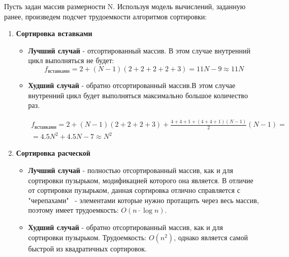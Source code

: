 \documentclass[a4paper,12pt]{report}
\begin{document}
\hspace{0.6cm}Пусть задан массив размерности N. Используя модель вычислений, заданную ранее, произведем подсчет трудоемкости алгоритмов сортировки:
\begin{enumerate}
\item \textbf{Сортировка вставками}
\begin{itemize}
\item \textbf{Лучший случай} - отсортированный массив. В этом случае внутренний цикл выполняться не будет:
\[
f_{вставками} = 2 + (N - 1)(2 + 2 + 2 + 2 + 3) = 11N - 9 \approx 11N 
\]
\item \textbf{Худший случай} - обратно отсортированный массив.В этом случае внутренний цикл будет выполняться максимально большое количество раз.

\begin{multline*}
f_{вставками} = 2 + (N - 1)(2 + 2 + 2 + 3) +  \frac{4 + 4 + 1 + (4+4+1)(N - 1)}{2}(N-1)=\\ =4.5N^2 + 4.5N - 7 \approx N^2
\end{multline*}
\end{itemize}

\item \textbf{Сортировка расческой}
\begin{itemize}
\item \textbf{Лучший случай} - полностью отсортированный массив, как и для сортировки пузырьком, модификацией которого она является. В отличие от сортировки пузырьком, данная сортировка отлично справляется с "черепахами" \ -  элементами которые нужно протащить через весь массив, поэтому имеет трудоемкость: $O(n\cdot \log n)$.

\item \textbf{Худший случай} - обратно отсортированный массив, как и для сортировки пузырьком. Трудоемкость: $O(n^{2})$, однако является самой быстрой из квадратичных сортировок.
\end{itemize}


\end{enumerate}
\end{document}
